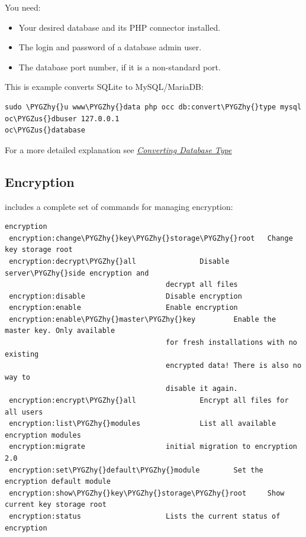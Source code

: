 \documentclass[letterpaper,10pt,english]{sphinxmanual}
\def\PYGZus{\char`\_}
\def\PYGZhy{\char`\-}
\begin{document}
You need:
\begin{itemize}
\item {} 
Your desired database and its PHP connector installed.

\item {} 
The login and password of a database admin user.

\item {} 
The database port number, if it is a non-standard port.

\end{itemize}

This is example converts SQLite to MySQL/MariaDB:

\begin{Verbatim}[commandchars=\\\{\}]
sudo \PYGZhy{}u www\PYGZhy{}data php occ db:convert\PYGZhy{}type mysql oc\PYGZus{}dbuser 127.0.0.1
oc\PYGZus{}database
\end{Verbatim}

For a more detailed explanation see
{\hyperref[configuration_database/db_conversion::doc]{\emph{Converting Database Type}}}


\subsection{Encryption}
\label{configuration_server/occ_command:encryption}\label{configuration_server/occ_command:encryption-label}
 includes a complete set of commands for managing encryption:

\begin{Verbatim}[commandchars=\\\{\}]
encryption
 encryption:change\PYGZhy{}key\PYGZhy{}storage\PYGZhy{}root   Change key storage root
 encryption:decrypt\PYGZhy{}all               Disable server\PYGZhy{}side encryption and
                                      decrypt all files
 encryption:disable                   Disable encryption
 encryption:enable                    Enable encryption
 encryption:enable\PYGZhy{}master\PYGZhy{}key         Enable the master key. Only available
                                      for fresh installations with no existing
                                      encrypted data! There is also no way to
                                      disable it again.
 encryption:encrypt\PYGZhy{}all               Encrypt all files for all users
 encryption:list\PYGZhy{}modules              List all available encryption modules
 encryption:migrate                   initial migration to encryption 2.0
 encryption:set\PYGZhy{}default\PYGZhy{}module        Set the encryption default module
 encryption:show\PYGZhy{}key\PYGZhy{}storage\PYGZhy{}root     Show current key storage root
 encryption:status                    Lists the current status of encryption
\end{Verbatim}
\end{document}
